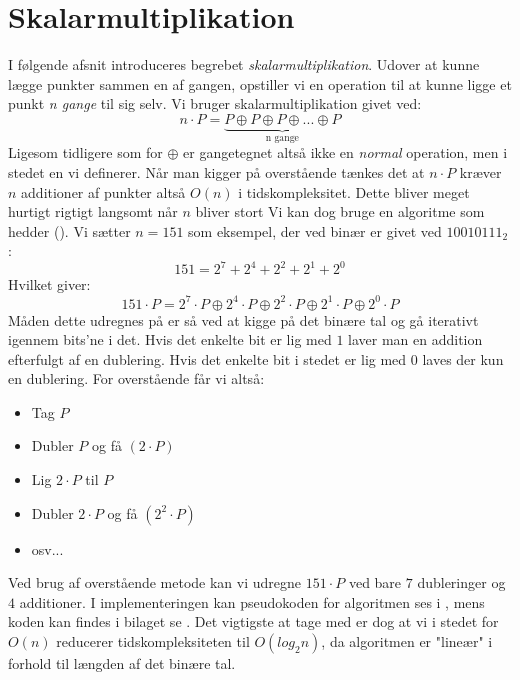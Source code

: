\section{Skalarmultiplikation}
I følgende afsnit introduceres begrebet \textit{skalarmultiplikation}. Udover at kunne lægge punkter sammen en af gangen, opstiller vi en operation til at kunne ligge et punkt \textit{n gange} til sig selv. Vi bruger skalarmultiplikation givet ved:
\begin{equation}
    n \cdot P =\underbrace{P\oplus P\oplus P\oplus ...\oplus P}_\text{n gange}
\end{equation}
Ligesom tidligere som for $\oplus$ er gangetegnet altså ikke en \textit{normal} operation, men i stedet en vi definerer.
Når man kigger på overstående tænkes det at $n \cdot P$ kræver $n$ additioner af punkter altså $O(n)$ i tidskompleksitet. Dette bliver meget hurtigt rigtigt langsomt når $n$ bliver stort Vi kan dog bruge en algoritme som hedder  (\cite{andreacorbellini2015}). Vi sætter $n=151$ som eksempel, der ved binær er givet ved $10010111_2$:
$$151=2^7+2^4+2^2+2^1+2^0$$
Hvilket giver:
$$151\cdot P=2^7 \cdot P \oplus 2^4 \cdot P \oplus 2^2 \cdot P \oplus 2^1 \cdot P \oplus 2^0 \cdot P$$
Måden dette udregnes på er så ved at kigge på det binære tal og gå iterativt igennem bits'ne i det. Hvis det enkelte bit er lig med $1$ laver man en addition efterfulgt af en dublering. Hvis det enkelte bit i stedet er lig med $0$ laves der kun en dublering. For overstående får vi altså:
\begin{itemize}
    \item Tag $P$
    \item Dubler $P$ og få $(2\cdot P)$
    \item Lig $2\cdot P$ til $P$
    \item Dubler $2\cdot P$ og få $(2^2 \cdot P)$
    \item osv...
\end{itemize}
Ved brug af overstående metode kan vi udregne $151 \cdot P$ ved bare $7$ dubleringer og $4$ additioner. I implementeringen kan pseudokoden for algoritmen ses i , mens koden kan findes i bilaget se . Det vigtigste at tage med er dog at vi i stedet for $O(n)$ reducerer tidskompleksiteten til $O(log_2 n)$, da algoritmen er "lineær" i forhold til længden af det binære tal.


